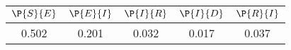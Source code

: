 \begin{tabular}{ccccc}
\hline
$\P{S}{E}$&$\P{E}{I}$&$\P{I}{R}$&$\P{I}{D}$&$\P{R}{I}$\\
\hline
0.502&0.201&0.032&0.017&0.037\\
\hline
\end{tabular}